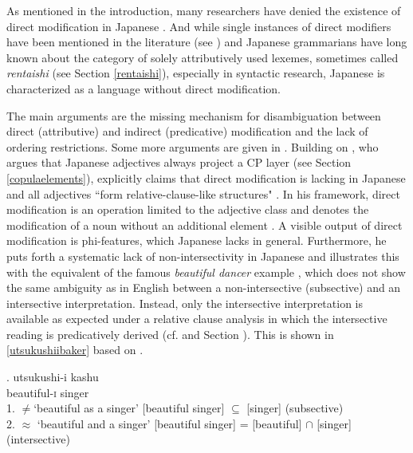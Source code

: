 As mentioned in the introduction, many researchers have denied the existence of direct modification in Japanese \citep{kuno:1973:structure, hinds:1988:japanese, whitman:1981:internal, kaplan:1995:the, sproat:1991:the, baker:2003:verbal, laenzlinger:2011:elements}. And while single instances of direct modifiers have been mentioned in the literature (see \citealt{watanabe:2017:attributive}) and Japanese grammarians have long known about the category of solely attributively used lexemes, sometimes called \textit{rentaishi} (see Section \ref{rentaishi}), especially in syntactic research, Japanese is characterized as a language without direct modification. 

The main arguments are the missing mechanism for disambiguation between direct (attributive) and indirect (predicative) modification and the lack of ordering restrictions. Some more arguments are given in \citet{baker:2003:verbal}. Building on \citet{nishiyama:1999:adj}, who argues that Japanese adjectives always project a CP layer (see Section \ref{copulaelements}), \citet{baker:2003:verbal} explicitly claims that direct modification is lacking in Japanese and all adjectives ``form relative-clause-like structures" \citep[19]{baker:2003:verbal}. In his framework, direct modification is an operation limited to the adjective class and denotes the modification of a noun without an additional element \citep[191]{baker:2003:cat}. A visible output of direct modification is phi-features, which Japanese lacks in general. Furthermore, he puts forth a systematic lack of non-intersectivity in Japanese and illustrates this with the equivalent of the famous \textit{beautiful dancer} example \citep{larson:1998:events}, which does not show the same ambiguity as in English between a non-intersective (subsective) and an intersective interpretation. Instead, only the intersective interpretation is available as expected under a relative clause analysis in which the intersective reading is predicatively derived (cf. \citealt{cinque:2010:adj} and Section ). This is shown in \ref{utsukushiibaker} based on \citet[3]{baker:2003:verbal}. 

\exg. utsukushi-i kashu\\
beautiful-\textsc{i} singer \\
1. $\neq$`beautiful as a singer’ [beautiful singer] $\subseteq$ [singer] (subsective)\\
2. $\approx$ `beautiful and a singer’ [beautiful singer] = [beautiful] $\cap$ [singer] (intersective) \label{utsukushiibaker}

